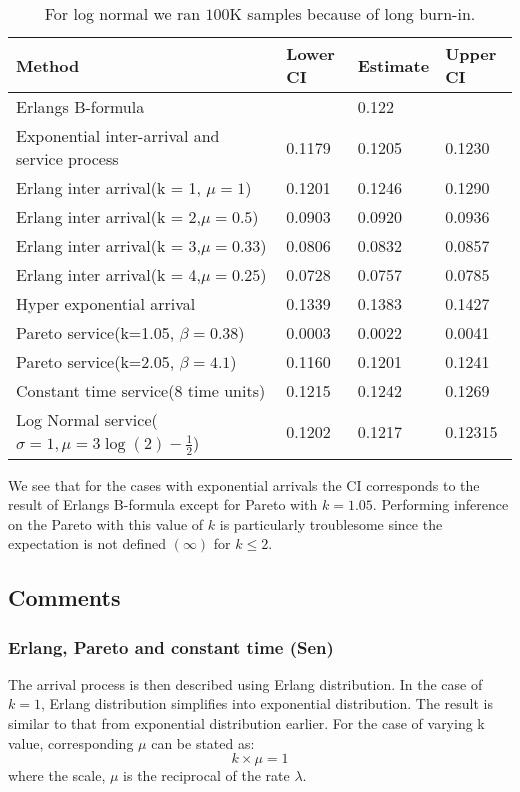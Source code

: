 \begin{table}[H]
\centering
\begin{tabular}{|l|l|l|l|}
\hline
 Method & Lower CI & Estimate & Upper CI  \\ \hline
 Erlangs B-formula & & 0.122 & \\ \hline
 Exponential inter-arrival and service process  & 0.1179  & 0.1205 & 0.1230  \\ \hline
 Erlang inter arrival(k = 1, $\mu = 1$)& 0.1201 & 0.1246  & 0.1290\\ \hline
 Erlang inter arrival(k = 2,$\mu = 0.5$)& 0.0903 & 0.0920  & 0.0936 \\ \hline
  Erlang inter arrival(k = 3,$\mu = 0.33$)& 0.0806 & 0.0832  & 0.0857 \\ \hline
 Erlang inter arrival(k = 4,$\mu = 0.25$)& 0.0728 & 0.0757  & 0.0785 \\ \hline
 Hyper exponential arrival & 0.1339 & 0.1383 & 0.1427 \\ \hline
 Pareto service(k=1.05, $\beta=0.38$) & 0.0003 & 0.0022 &  0.0041  \\ \hline
 Pareto service(k=2.05, $\beta=4.1$)&0.1160&0.1201&0.1241\\ \hline
Constant time service(8 time units)&0.1215  & 0.1242 & 0.1269 \\ \hline
 Log Normal service($\sigma = 1, \mu = 3 \log(2) - \frac{1}{2}$) &0.1202 & 0.1217 & 0.12315  \\ \hline 

\end{tabular}
\caption{For log normal we ran $100$K samples because of long burn-in. }
\label{tab:week4}
\end{table}

We see that for the cases with exponential arrivals the CI corresponds to the result of Erlangs B-formula except for Pareto with $k=1.05$. Performing inference on the Pareto with this value of $k$ is particularly troublesome since the expectation is not defined $(\infty)$ for $k \leq 2$.

\subsection*{Comments}

\subsubsection*{Erlang, Pareto and constant time (Sen)}
The arrival process is then described using Erlang distribution. In the case of $k=1$, Erlang distribution simplifies into exponential distribution. The result is similar to that from exponential distribution earlier. For the case of varying k value, corresponding $\mu$ can be stated as:
\begin{equation}
    k \times \mu = 1
\end{equation}
where the scale, $\mu$ is the reciprocal of the rate $\lambda$.

